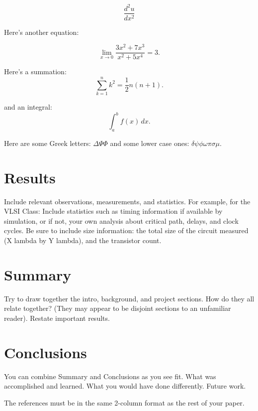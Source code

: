 \documentclass[final]{ieee}
\begin{document}
\[ \frac{d^2 u}{dx^2} \]

Here's another equation:

\[ \lim_{x \to 0} \frac{3x^2 +7x^3}{x^2 +5x^4} = 3.\]

Here's a summation:
\[ \sum_{k=1}^n k^2 = \frac{1}{2} n (n+1).\] 

and an integral:
\[ \int_a^b f(x)\,dx.\]

Here are some Greek letters:
$ \Delta \Psi \Phi $
and some lower case ones:
$ \delta \psi \phi \omega \pi \sigma \mu $.








\section{Results}
            Include relevant observations, measurements, and statistics.
            For example, for the VLSI Class: Include statistics such as
            timing information if available by simulation, or if not,
            your own analysis about critical path, delays, and clock
            cycles. Be sure to include size information: the total size
            of the circuit measured (X lambda by Y lambda), and the
            transistor count. 
            
\section{Summary}
           Try to draw together the intro, background, and project
            sections.
           How do they all relate together? (They may appear to be
            disjoint sections to an unfamiliar reader).
           Restate important results.
\section{Conclusions}
           You can combine Summary and Conclusions as you see fit.
           What was accomplished and learned.
           What you would have done differently.
           Future work.
           
The references must be in the same 2-column format as the rest of your
paper.
\end{document}
